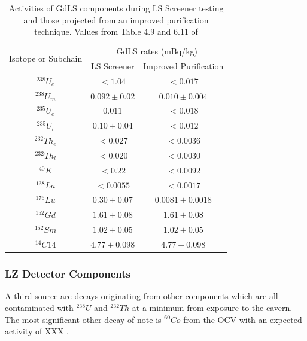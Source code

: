 \begin{table}[!htbp]
    \centering
    \begin{tabular}{c|c|c}
        \multirow{2}{*}{Isotope or Subchain}  &  \multicolumn{2}{c}{GdLS rates (mBq/kg)}      \\ 
                             &  LS Screener          & Improved Purification \\ \hline
        ${}^{238}U_{e}$      &  $< 1.04$             & $< 0.017$             \\ 
        ${}^{238}U_{m}$      &  $0.092\pm0.02$       & $0.010\pm0.004$       \\
        ${}^{235}U_{e}$      &  $0.011$              & $< 0.018$             \\
        ${}^{235}U_{l}$      &  $0.10\pm0.04$        & $< 0.012$             \\
        ${}^{232}Th_{e}$     &  $< 0.027$            & $< 0.0036$            \\
        ${}^{232}Th_{l}$     &  $< 0.020$            & $< 0.0030$            \\
        ${}^{40}K$           &  $< 0.22$             & $< 0.0092$            \\
        ${}^{138}La$         &  $< 0.0055$           & $< 0.0017$            \\
        ${}^{176}Lu$         &  $0.30\pm0.07$        & $0.0081\pm0.0018$     \\
        ${}^{152}{Gd}$       &  $1.61\pm0.08$        & $1.61\pm0.08$         \\
        ${}^{152}{Sm}$       &  $1.02\pm0.05$        & $1.02\pm0.05$         \\
        ${}^{14}{C14}$       &  $4.77\pm0.098$       & $4.77\pm0.098$ 
    \end{tabular}
    \caption{Activities of GdLS components during LS Screener testing and those projected from an improved purification technique. Values from Table 4.9 and 6.11 of \cite{scotthaselschwardt_thesis_ref}}
    \label{tab:gdls_assay_rates}
\end{table}


\subsubsection{LZ Detector Components}
\par
A third source are decays originating from other components which are all contaminated with ${}^{238}U$ and ${}^{232}Th$ at a minimum from exposure to the cavern.
The most significant other decay of note is ${}^{60}Co$ from the OCV with an expected activity of XXX \cite{LZ_assay_ref}.


